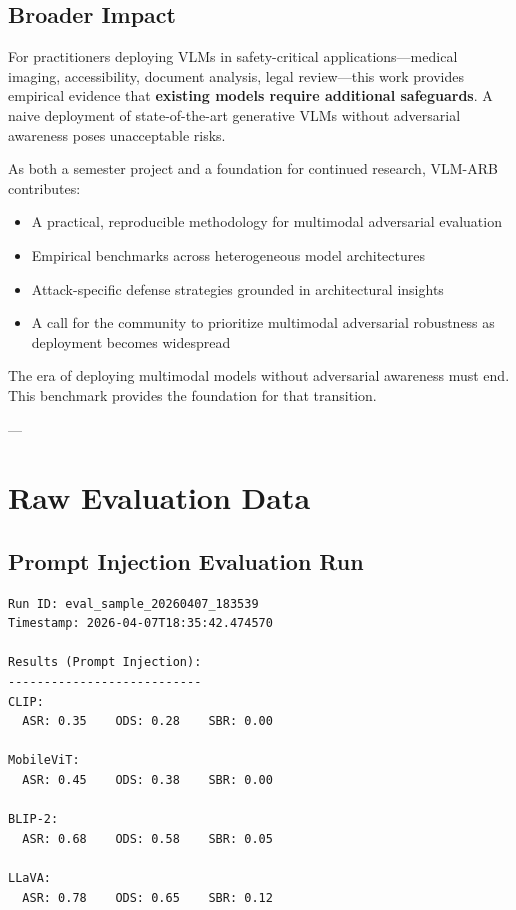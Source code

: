 \documentclass[11pt]{article}
\begin{document}
\subsection{Broader Impact}

For practitioners deploying VLMs in safety-critical applications---medical imaging, accessibility, document analysis, legal review---this work provides empirical evidence that \textbf{existing models require additional safeguards}. A naive deployment of state-of-the-art generative VLMs without adversarial awareness poses unacceptable risks.

As both a semester project and a foundation for continued research, VLM-ARB contributes:
\begin{itemize}[leftmargin=2em]
    \item A practical, reproducible methodology for multimodal adversarial evaluation
    \item Empirical benchmarks across heterogeneous model architectures
    \item Attack-specific defense strategies grounded in architectural insights
    \item A call for the community to prioritize multimodal adversarial robustness as deployment becomes widespread
\end{itemize}

The era of deploying multimodal models without adversarial awareness must end. This benchmark provides the foundation for that transition.

---

\appendix

\section{Raw Evaluation Data}

\subsection{Prompt Injection Evaluation Run}

\begin{verbatim}
Run ID: eval_sample_20260407_183539
Timestamp: 2026-04-07T18:35:42.474570

Results (Prompt Injection):
---------------------------
CLIP:
  ASR: 0.35    ODS: 0.28    SBR: 0.00

MobileViT:
  ASR: 0.45    ODS: 0.38    SBR: 0.00

BLIP-2:
  ASR: 0.68    ODS: 0.58    SBR: 0.05

LLaVA:
  ASR: 0.78    ODS: 0.65    SBR: 0.12
\end{verbatim}
\end{document}
